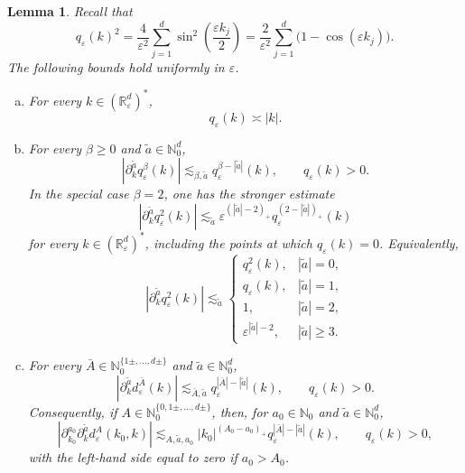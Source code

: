 \documentclass{article}
\numberwithin{equation}{section}
\theoremstyle{plain}
\newtheorem{lemma}[theorem]{Lemma}
\theoremstyle{definition}
\begin{document}
\begin{lemma}
	\label{lem:q-epsilon-bounds}
	Recall that
	\[
	q_\varepsilon(k)^2
	=
	\frac4{\varepsilon^2}
	\sum_{j=1}^d
	\sin^2\left(\frac{\varepsilon k_j}{2}\right)
	=
	\frac2{\varepsilon^2}
	\sum_{j=1}^d
	\bigl(1-\cos(\varepsilon k_j)\bigr).
	\]
	The following bounds hold uniformly in \(\varepsilon\).
	
	\begin{enumerate}[(a)]
		\item For every \(k\in(\mathbb R_\varepsilon^d)^\ast\),
		\[
		q_\varepsilon(k)\asymp |k|.
		\]
		
		\item For every \(\beta\geqslant0\) and
		\(\tilde a\in\mathbb N_0^d\),
		\begin{equation}
			\label{eq:q-epsilon-derivatives}
			\left|
			\partial_k^{\tilde a}q_\varepsilon^\beta(k)
			\right|
			\lesssim_{\beta,\tilde a}
			q_\varepsilon^{\beta-|\tilde a|}(k),
			\qquad q_\varepsilon(k)>0.
		\end{equation}
		In the special case \(\beta=2\), one has the stronger estimate
		\begin{equation}
			\label{eq:q-epsilon-square-derivatives}
			\left|
			\partial_k^{\tilde a}q_\varepsilon^2(k)
			\right|
			\lesssim_{\tilde a}
			\varepsilon^{(|\tilde a|-2)_+}
			q_\varepsilon^{(2-|\tilde a|)_+}(k)
		\end{equation}
		for every \(k\in(\mathbb R_\varepsilon^d)^\ast\), including the
		points at which \(q_\varepsilon(k)=0\). Equivalently,
		\[
		\left|
		\partial_k^{\tilde a}q_\varepsilon^2(k)
		\right|
		\lesssim_{\tilde a}
		\begin{cases}
			q_\varepsilon^2(k),
			& |\tilde a|=0,\\
			q_\varepsilon(k),
			& |\tilde a|=1,\\
			1,
			& |\tilde a|=2,\\
			\varepsilon^{|\tilde a|-2},
			& |\tilde a|\geqslant3.
		\end{cases}
		\]
		
		\item For every
		\(\bar A\in\mathbb N_0^{\{1\pm,\ldots,d\pm\}}\) and
		\(\tilde a\in\mathbb N_0^d\),
		\begin{equation}
			\label{eq:d-epsilon-derivatives}
			\left|
			\partial_k^{\tilde a}d_\varepsilon^{\bar A}(k)
			\right|
			\lesssim_{\bar A,\tilde a}
			q_\varepsilon^{|\bar A|-|\tilde a|}(k),
			\qquad q_\varepsilon(k)>0.
		\end{equation}
		Consequently, if
		\(A\in\mathbb N_0^{\{0,1\pm,\ldots,d\pm\}}\), then, for
		\(a_0\in\mathbb N_0\) and \(\tilde a\in\mathbb N_0^d\),
		\begin{equation}
			\label{eq:d-epsilon-full-derivatives}
			\left|
			\partial_{k_0}^{a_0}\partial_k^{\tilde a}
			d_\varepsilon^A(k_0,k)
			\right|
			\lesssim_{A,\tilde a,a_0}
			|k_0|^{(A_0-a_0)_+}
			q_\varepsilon^{|\bar A|-|\tilde a|}(k),
			\qquad q_\varepsilon(k)>0,
		\end{equation}
		with the left-hand side equal to zero if \(a_0>A_0\).
		

\end{enumerate}
\end{lemma}
\end{document}
